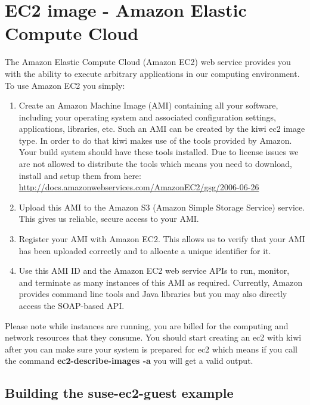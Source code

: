\chapter{EC2 image - Amazon Elastic Compute Cloud}
\label{chapter:ec2}
\minitoc

The Amazon Elastic Compute Cloud (Amazon EC2) web service provides you
with the ability to execute arbitrary applications in our computing
environment. To use Amazon EC2 you simply:

\begin{enumerate}
\item Create an Amazon Machine Image (AMI) containing all your software,
      including your operating system and associated configuration settings,
      applications, libraries, etc. Such an AMI can be created by the kiwi
      ec2 image type. In order to do that kiwi makes use of the tools
      provided by Amazon. Your build system should have these tools
      installed. Due to license issues we are not allowed to distribute
      the tools which means you need to download, install and setup
      them from here: \url{http://docs.amazonwebservices.com/AmazonEC2/gsg/2006-06-26}
\item Upload this AMI to the Amazon S3 (Amazon Simple Storage Service)
      service. This gives us reliable, secure access to your AMI.
\item Register your AMI with Amazon EC2. This allows us to verify that your
      AMI has been uploaded correctly and to allocate a unique identifier
      for it.
\item Use this AMI ID and the Amazon EC2 web service APIs to run, monitor,
      and terminate as many instances of this AMI as required. Currently,
      Amazon provides command line tools and Java libraries but you may also
      directly access the SOAP-based API.
\end{enumerate}

Please note while instances are running, you are billed for the
computing and network resources that they consume.
You should start creating an ec2 with kiwi after you can make sure
your system is prepared for ec2 which means if you call the command
\textbf{ec2-describe-images -a} you will get a valid output.

\section{Building the suse-ec2-guest example}


